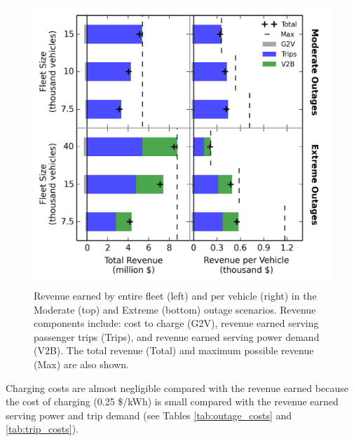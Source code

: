 \documentclass[journal]{IEEEtran}
\begin{document}
\begin{figure}[!htbp]
  \includegraphics[width=0.8\linewidth]{plots/full_revenue_barchart.png}
  \caption{Revenue earned by entire fleet (left) and per vehicle (right) in the Moderate (top) and Extreme (bottom) outage scenarios. Revenue components include: cost to charge (G2V), revenue earned serving passenger trips (Trips), and revenue earned serving power demand (V2B). The total revenue (Total) and maximum possible revenue (Max) are also shown.}
  \label{fig:revenue_bar}
\end{figure}

Charging costs are almost negligible compared with the revenue earned because the cost of charging (0.25 \$/kWh) is small compared with the revenue earned serving power and trip demand (see Tables \ref{tab:outage_costs} and \ref{tab:trip_costs}).


\end{document}
